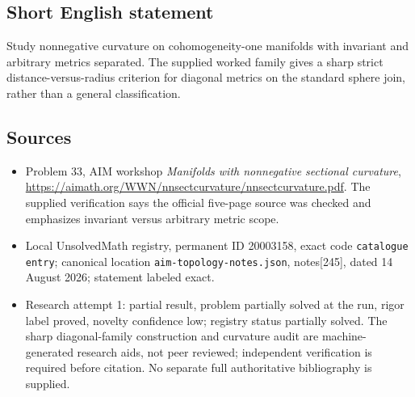 \documentclass[11pt]{article}
\begin{document}
\subsection{Short English statement}
Study nonnegative curvature on cohomogeneity-one manifolds with invariant and arbitrary metrics separated. The supplied worked family gives a sharp strict distance-versus-radius criterion for diagonal metrics on the standard sphere join, rather than a general classification.
\subsection{Sources}
\begin{itemize}
\item Problem 33, AIM workshop \emph{Manifolds with nonnegative sectional curvature}, \url{https://aimath.org/WWN/nnsectcurvature/nnsectcurvature.pdf}. The supplied verification says the official five-page source was checked and emphasizes invariant versus arbitrary metric scope.
\item Local UnsolvedMath registry, permanent ID 20003158, exact code \texttt{catalogue entry}; canonical location \texttt{aim-topology-notes.json}, notes[245], dated 14 August 2026; statement labeled exact.
\item Research attempt 1: partial result, problem partially solved at the run, rigor label proved, novelty confidence low; registry status partially solved. The sharp diagonal-family construction and curvature audit are machine-generated research aids, not peer reviewed; independent verification is required before citation. No separate full authoritative bibliography is supplied.
\end{itemize}
\end{document}
